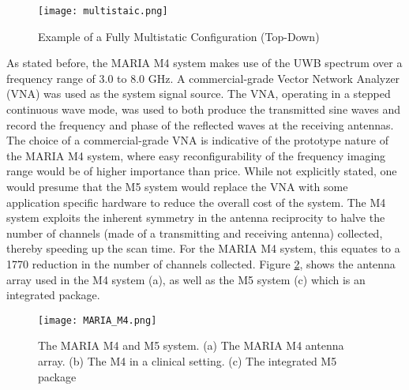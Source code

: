 \begin{figure}
    \texttt{[image: multistaic.png]}
    \centering
    \caption{Example of a Fully Multistatic Configuration (Top-Down)}
    \label{fig:MultistaticExample}
\end{figure}

\noindent As stated before, the MARIA M4 system makes use of the UWB spectrum over a frequency range of 3.0 to 8.0 GHz.
A commercial-grade Vector Network Analyzer (VNA) was used as the system signal source. The VNA, operating in a stepped
continuous wave mode, was used to both produce the transmitted sine waves and record the frequency and phase of the
reflected waves at the receiving antennas. The choice of a commercial-grade VNA is indicative of the prototype nature of
the MARIA M4 system, where easy reconfigurability of the frequency imaging range would be of higher importance than
price. While not explicitly stated, one would presume that the M5 system would replace the VNA with some application
specific hardware to reduce the overall cost of the system. The M4 system exploits the inherent symmetry in the antenna
reciprocity to halve the number of channels (made of a transmitting and receiving antenna) collected, thereby speeding
up the scan time. For the MARIA M4 system, this equates to a 1770 reduction in the number of channels collected. Figure
\ref{fig:MARIAM4}, shows the antenna array used in the M4 system (a), as well as the M5 system (c) which is an
integrated package.


\begin{figure}
    \texttt{[image: MARIA\_M4.png]}
    \centering
    \caption{The MARIA M4 and M5 system. (a) The MARIA M4 antenna array. (b) The M4 in a clinical setting. (c) The integrated M5 package \cite{preeceMARIAM4Clinical2016}}
    \label{fig:MARIAM4}
\end{figure}

